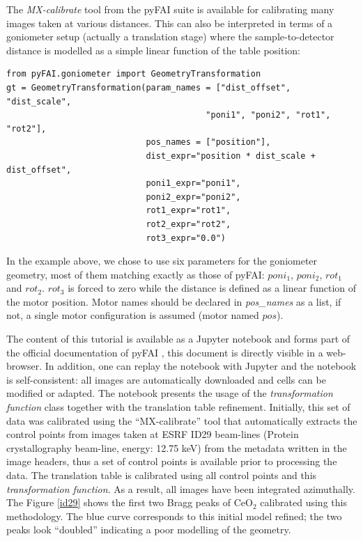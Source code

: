 \documentclass[preprint]{iucr}              %
\begin{document}
The \textit{MX-calibrate} tool from the pyFAI suite is available for
calibrating many images taken at various distances.
This can also be interpreted in terms of a goniometer setup (actually a translation stage) 
where the sample-to-detector distance is modelled as a
simple linear function of the table position:

\begin{verbatim}
from pyFAI.goniometer import GeometryTransformation
gt = GeometryTransformation(param_names = ["dist_offset", "dist_scale", 
                                        "poni1", "poni2", "rot1", "rot2"],
                            pos_names = ["position"],
                            dist_expr="position * dist_scale + dist_offset", 
                            poni1_expr="poni1",
                            poni2_expr="poni2", 
                            rot1_expr="rot1", 
                            rot2_expr="rot2", 
                            rot3_expr="0.0")
\end{verbatim}
 
In the example above, we chose to use six parameters for the goniometer
geometry, most of them matching exactly as those of pyFAI: 
$poni_1$, $poni_2$, $rot_1$
and $rot_2$. 
$rot_3$ is forced to zero while the distance is defined as a 
linear function of the motor position. 
Motor names should be declared in \textit{pos\_names} as a list, 
if not, a single motor configuration is assumed (motor named $pos$).

The content of this tutorial is available as a Jupyter
notebook \cite{ipython} and forms part of the official documentation of pyFAI
\cite{translation_table}, this document is directly visible in a web-browser. 
In addition, one can replay the notebook with Jupyter and the notebook is
self-consistent: all images are automatically downloaded and cells can be
modified or adapted.
The notebook presents the usage of the \textit{transformation function} class
together with the translation table refinement.
Initially, this set of data was calibrated using the ``MX-calibrate'' tool
that automatically extracts the control points from images taken at
ESRF ID29 beam-lines (Protein crystallography beam-line, energy: 12.75 keV) from
the metadata written in the image headers, thus a set of control points is
available prior to processing the data. 
The translation table is calibrated using all control points
and this \textit{transformation function}.
As a result, all images have been integrated azimuthally.
The Figure \ref{id29} shows the first two Bragg peaks of CeO$_2$ calibrated
using this methodology. 
The blue curve corresponds to this initial model refined; the two peaks look
``doubled'' indicating a poor modelling of the geometry.
\end{document}
